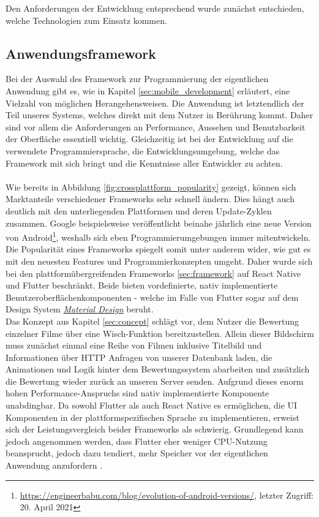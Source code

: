 Den Anforderungen der Entwicklung entsprechend wurde zunächst entschieden, welche Technologien zum Einsatz kommen. 

\subsection{Anwendungsframework}
Bei der Auswahl des Framework zur Programmierung der eigentlichen Anwendung gibt es, wie in Kapitel \ref{sec:mobile_development} erläutert, eine Vielzahl von möglichen Herangehensweisen.
Die Anwendung ist letztendlich der Teil unseres Systems, welches direkt mit dem Nutzer in Berührung kommt.
Daher sind vor allem die Anforderungen an Performance, Aussehen und Benutzbarkeit der Oberfläche essentiell wichtig.
Gleichzeitig ist bei der Entwicklung auf die verwendete Programmiersprache, die Entwicklungsumgebung, welche das Framework mit sich bringt und die Kenntnisse aller Entwickler zu achten.\\
\\
Wie bereits in Abbildung \ref{fig:crossplattform_popularity} gezeigt, können sich Marktanteile verschiedener Frameworks sehr schnell ändern. 
Dies hängt auch deutlich mit den unterliegenden Plattformen und deren Update-Zyklen zusammen.
Google beispielsweise veröffentlicht beinahe jährlich eine neue Version von Android\footnote{\url{https://engineerbabu.com/blog/evolution-of-android-versions/}, letzter Zugriff: 20. April 2021}, weshalb sich eben Programmierumgebungen immer mitentwickeln.
Die Popularität eines Frameworks spiegelt somit unter anderem wider, wie gut es mit den neuesten Features und Programmierkonzepten umgeht. 
Daher wurde sich bei den plattformübergreifenden Frameworks \ref{sec:framework} auf React Native und Flutter beschränkt. 
Beide bieten vordefinierte, nativ implementierte Benutzeroberflächenkomponenten - welche im Falle von Flutter sogar auf dem Design System \href{https://material.io/}{\textit{Material Design}} beruht.\\
Das Konzept aus Kapitel \ref{sec:concept} schlägt vor, dem Nutzer die Bewertung einzelner Filme über eine Wisch-Funktion bereitzustellen.
Allein dieser Bildschirm muss zunächst einmal eine Reihe von Filmen inklusive Titelbild und Informationen über HTTP Anfragen von unserer Datenbank laden, die Animationen und Logik hinter dem Bewertungssystem abarbeiten und zusätzlich die Bewertung wieder zurück an unseren Server senden.
Aufgrund dieses enorm hohen Performance-Anspruchs sind nativ implementierte Komponente unabdingbar.
Da sowohl Flutter als auch React Native es ermöglichen, die UI Komponenten in der plattformspezifischen Sprache zu implementieren, erweist sich der Leistungsvergleich beider Frameworks als schwierig.
Grundlegend kann jedoch angenommen werden, dass Flutter eher weniger CPU-Nutzung beansprucht, jedoch dazu tendiert, mehr Speicher vor der eigentlichen Anwendung anzufordern \cite{bjorn-hansen2020}.

